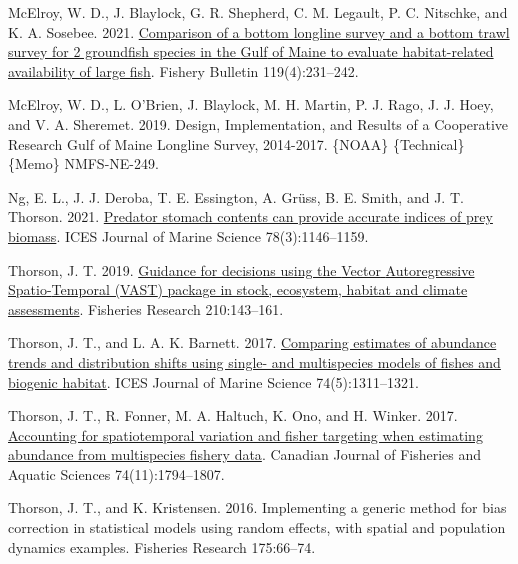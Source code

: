 \documentclass[
]{article}
\newlength{\cslhangindent}
\newlength{\cslentryspacingunit} %
\newenvironment{CSLReferences}[2] %
 {%
  \setlength{\parindent}{0pt}
  \ifodd #1
  \let\oldpar\par
  \def\par{\hangindent=\cslhangindent\oldpar}
  \fi
  \setlength{\parskip}{#2\cslentryspacingunit}
 }%
 {}
\begin{document}
\begin{CSLReferences}{1}{0}
\leavevmode{}%
McElroy, W. D., J. Blaylock, G. R. Shepherd, C. M. Legault, P. C. Nitschke, and K. A. Sosebee. 2021. \href{https://doi.org/10.7755/FB.119.4.3}{Comparison of a bottom longline survey and a bottom trawl survey for 2 groundfish species in the {Gulf} of {Maine} to evaluate habitat-related availability of large fish}. Fishery Bulletin 119(4):231--242.

\leavevmode{}%
McElroy, W. D., L. O'Brien, J. Blaylock, M. H. Martin, P. J. Rago, J. J. Hoey, and V. A. Sheremet. 2019. Design, {Implementation}, and {Results} of a {Cooperative} {Research} {Gulf} of {Maine} {Longline} {Survey}, 2014-2017. \{NOAA\} \{Technical\} \{Memo\} NMFS-NE-249.

\leavevmode{}%
Ng, E. L., J. J. Deroba, T. E. Essington, A. Grüss, B. E. Smith, and J. T. Thorson. 2021. \href{https://doi.org/10.1093/icesjms/fsab026}{Predator stomach contents can provide accurate indices of prey biomass}. ICES Journal of Marine Science 78(3):1146--1159.

\leavevmode{}%
Thorson, J. T. 2019. \href{https://doi.org/10.1016/j.fishres.2018.10.013}{Guidance for decisions using the {Vector} {Autoregressive} {Spatio}-{Temporal} ({VAST}) package in stock, ecosystem, habitat and climate assessments}. Fisheries Research 210:143--161.

\leavevmode{}%
Thorson, J. T., and L. A. K. Barnett. 2017. \href{https://doi.org/10.1093/icesjms/fsw193}{Comparing estimates of abundance trends and distribution shifts using single- and multispecies models of fishes and biogenic habitat}. ICES Journal of Marine Science 74(5):1311--1321.

\leavevmode{}%
Thorson, J. T., R. Fonner, M. A. Haltuch, K. Ono, and H. Winker. 2017. \href{https://doi.org/10.1139/cjfas-2015-0598}{Accounting for spatiotemporal variation and fisher targeting when estimating abundance from multispecies fishery data}. Canadian Journal of Fisheries and Aquatic Sciences 74(11):1794--1807.

\leavevmode{}%
Thorson, J. T., and K. Kristensen. 2016. Implementing a generic method for bias correction in statistical models using random effects, with spatial and population dynamics examples. Fisheries Research 175:66--74.


\end{CSLReferences}
\end{document}
